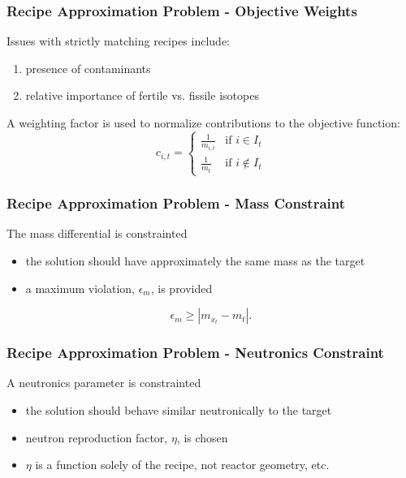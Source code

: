 \begin{frame}[ctb!]
  \frametitle{Recipe Approximation Problem - Objective Weights}

  Issues with strictly matching recipes include:
  \begin{enumerate}
    \item presence of contaminants
    \item relative importance of fertile vs. fissile isotopes
  \end{enumerate}

  \vspace{0.2cm}

  A weighting factor is used to normalize contributions to the objective
  function:
  \begin{equation}\label{eqs:weights}
    c_{i,t} = 
    \begin{cases}
      \frac{1}{m_{i,t}} & \text{if } i \in I_{t} \\
      \frac{1}{m_{t}}   & \text{if } i \not\in I_{t}
    \end{cases}
  \end{equation}  
\end{frame}

\begin{frame}[ctb!]
  \frametitle{Recipe Approximation Problem - Mass Constraint}

  The mass differential is constrainted
  \begin{itemize}
    \item the solution should have approximately the same mass as the target
    \item a maximum violation, $\epsilon_{m}$, is provided
  \end{itemize}
  
  \begin{equation}\label{eqs:mass-constraint-simple}
    \epsilon_{m} \geq \left| m_{x_t} - m_{t} \right|.
  \end{equation}
\end{frame}

\begin{frame}[ctb!]
  \frametitle{Recipe Approximation Problem - Neutronics Constraint}

  A neutronics parameter is constrainted
  \begin{itemize}
    \item the solution should behave similar neutronically to the target
    \item neutron reproduction factor, $\eta$, is chosen
    \item $\eta$ is a function solely of the recipe, not reactor geometry, etc.
  \end{itemize}
\end{frame}

